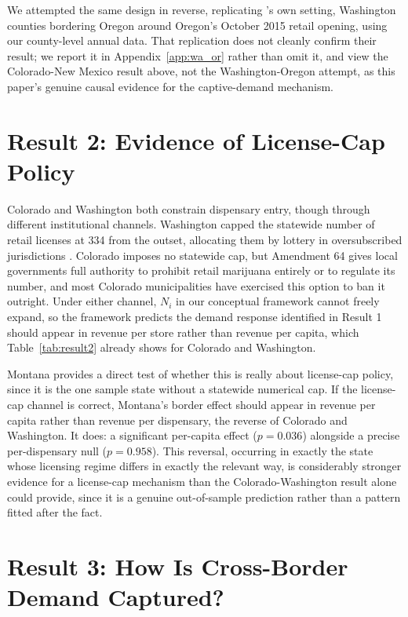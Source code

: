 \documentclass[12pt]{article}
\begin{document}
We attempted the same design in reverse, replicating \citet{HansenMillerWeber2020}'s own setting, Washington
counties bordering Oregon around Oregon's October 2015 retail opening, using our county-level annual data.
That replication does not cleanly confirm their result; we report it in Appendix~\ref{app:wa_or} rather than
omit it, and view the Colorado-New Mexico result above, not the Washington-Oregon attempt, as this paper's
genuine causal evidence for the captive-demand mechanism.

\section{Result 2: Evidence of License-Cap Policy}
\label{sec:result2}

Colorado and Washington both constrain dispensary entry, though through different institutional channels.
Washington capped the statewide number of retail licenses at 334 from the outset, allocating them by lottery
in oversubscribed jurisdictions \citep{WSLCB2014LotteryPR}. Colorado imposes no statewide cap, but Amendment
64 gives local governments full authority to prohibit retail marijuana entirely or to regulate its number,
and most Colorado municipalities have exercised this option to ban it outright. Under either channel, $N_i$
in our conceptual framework cannot freely expand, so the framework predicts the demand response identified
in Result 1 should appear in revenue per store rather than revenue per capita, which Table~\ref{tab:result2}
already shows for Colorado and Washington.



Montana provides a direct test of whether this is really about license-cap policy, since it is the one
sample state without a statewide numerical cap. If the license-cap channel is correct, Montana's border
effect should appear in revenue per capita rather than revenue per dispensary, the reverse of Colorado and
Washington. It does: a significant per-capita effect ($p=0.036$) alongside a precise per-dispensary null
($p=0.958$). This reversal, occurring in exactly the state whose licensing regime differs in exactly the
relevant way, is considerably stronger evidence for a license-cap mechanism than the Colorado-Washington
result alone could provide, since it is a genuine out-of-sample prediction rather than a pattern fitted after
the fact.

\section{Result 3: How Is Cross-Border Demand Captured?}
\label{sec:result3}
\end{document}
